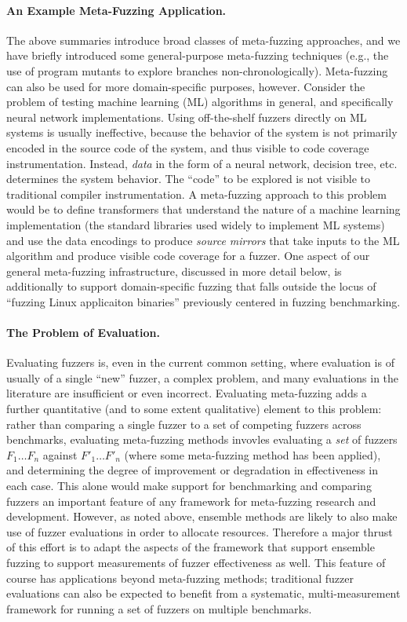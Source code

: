 \documentclass[numbers]{proposalnsf}
\begin{document}
\paragraph{An Example Meta-Fuzzing Application.} The above summaries introduce broad classes of meta-fuzzing approaches, and we have briefly introduced some general-purpose meta-fuzzing techniques (e.g., the use of program mutants to explore branches non-chronologically).  Meta-fuzzing can also be used for more domain-specific purposes, however.  Consider the problem of testing machine learning (ML) algorithms in general, and specifically neural network implementations.  Using off-the-shelf fuzzers directly on ML systems is usually ineffective, because the behavior of the system is not primarily encoded in the source code of the system, and thus visible to code coverage instrumentation.  Instead, \emph{data} in the form of a neural network, decision tree, etc. determines the system behavior.  The ``code'' to be explored is not visible to traditional compiler instrumentation.  A meta-fuzzing approach to this problem would be to define transformers that understand the nature of a machine learning implementation (the standard libraries used widely to implement ML systems) and use the data encodings to produce \emph{source mirrors} that take inputs to the ML algorithm and produce visible code coverage for a fuzzer.  One aspect of our general meta-fuzzing infrastructure, discussed in more detail below, is additionally to support domain-specific fuzzing that falls outside the locus of ``fuzzing Linux applicaiton binaries'' previously centered in fuzzing benchmarking.


\paragraph{The Problem of Evaluation.} Evaluating fuzzers is, even in the current common setting, where evaluation is of usually of a single ``new'' fuzzer, a complex problem, and many evaluations in the literature are insufficient or even incorrect.  Evaluating meta-fuzzing adds a further quantitative (and to some extent qualitative) element to this problem: rather than comparing a single fuzzer to a set of competing fuzzers across benchmarks, evaluating meta-fuzzing methods invovles evaluating a \emph{set} of fuzzers $F_1 \ldots F_n$ against $F'_1 \ldots F'_n$ (where some meta-fuzzing method has been applied), and determining the degree of improvement or degradation in effectiveness in each case.  This alone would make support for benchmarking and comparing fuzzers an important feature of any framework for meta-fuzzing research and development.  However, as noted above, ensemble methods are likely to also make use of fuzzer evaluations in order to allocate resources.  Therefore a major thrust of this effort is to adapt the aspects of the framework that support ensemble fuzzing to support measurements of fuzzer effectiveness as well.  This feature of course has applications beyond meta-fuzzing methods; traditional fuzzer evaluations can also be expected to benefit from a systematic, multi-measurement framework for running a set of fuzzers on multiple benchmarks.
\end{document}
